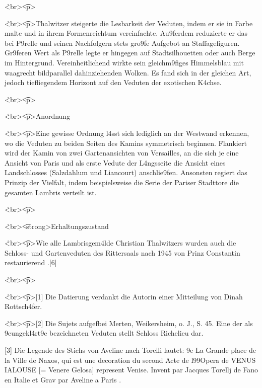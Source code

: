 \documentclass[
  letterpaper,
]{book}
\begin{document}
\r<br\textgreater{}\t<p\textgreater{}

\r<br\textgreater{}\t<p\textgreater Thalwitzer steigerte die Lesbarkeit
der Veduten, indem er sie in Farbe malte und in ihrem Formenreichtum
vereinfachte. Au\x9ferdem reduzierte er das bei P\xa9relle und
seinen Nachfolgern stets gro\x9fe Aufgebot an Staffagefiguren.
Gr\x9feren Wert als P\xa9relle legte er hingegen auf
Stadtsilhouetten oder auch Berge im Hintergrund. Vereinheitlichend
wirkte sein gleichm\x9figes Himmelsblau mit waagrecht
bildparallel dahinziehenden Wolken. Es fand sich in der gleichen Art,
jedoch \xbcber tiefliegendem Horizont auf den Veduten der exotischen
K\xbcbelgew{}\xa4chse.

\r<br\textgreater{}\t<p\textgreater{}

\r<br\textgreater{}\t<p\textgreater{}Anordnung

\r<br\textgreater{}\t<p\textgreater Eine gewisse Ordnung l\xa4sst
sich lediglich an der Westwand erkennen, wo die Veduten zu beiden Seiten
des Kamins symmetrisch beginnen. Flankiert wird der Kamin von zwei
Gartenansichten von Versailles, an die sich je eine Ansicht von Paris
und als erste Vedute der L\xa4ngsseite die Ansicht eines
Landschlosses (Salzdahlum und Liancourt) anschlie\x9fen. Ansonsten
regiert das Prinzip der Vielfalt, indem beispielsweise die Serie der
Pariser Stadttore \xbcber die gesamten Lambris verteilt ist.

\r<br\textgreater{}\t<p\textgreater{}

\r<br\textgreater{}\t<h2><strong\textgreater Erhaltungszustand

\r<br\textgreater{}\t<p\textgreater Wie alle Lambrisgem\xa4lde
Christian Thalwitzers wurden auch die Schloss- und Gartenveduten des
Rittersaals nach 1945 von Prinz Constantin restaurierend
\xbcbermalt.{[}6{]}

\r<br\textgreater{}\t<p\textgreater{}

\r<br\textgreater{}\t<p\textgreater{[}1{]} Die Datierung verdankt die
Autorin einer Mitteilung von Dinah Rottsch\xa4fer.

\r<br\textgreater{}\t<p\textgreater{[}2{]} Die Sujets
aufgef\xbchrt bei Merten, Weikersheim, o. J., S. 45.
Eine der als \x9eungekl\xa4rt\x9c bezeichneten
Veduten stellt Schloss Richelieu dar.

{[}3{]} Die Legende des Stichs von Aveline nach Torelli lautet:
\x9e La Grande place de la Ville de Naxos, qui est une
decoration du second Acte de l\x99Opera de VENUS IALOUSE {[}=
Venere Gelosa{]} represent  Venise. Invent par
Jacques Torellj de Fano en Italie et Grav par Aveline a Paris
\xbb.
\end{document}
